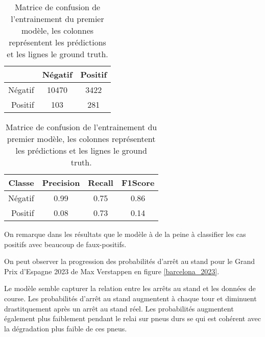 \begin{table}[H]
  \begin{center}
    \caption{\label{rf_matrix}Matrice de confusion de l'entrainement du premier modèle, les colonnes représentent les prédictions et les lignes le ground truth.}
    \begin{tabular}{r|cc}
              & Négatif & Positif \\ \hline
      Négatif & 10470   & 3422    \\
      Positif & 103     & 281     \\
    \end{tabular}
  \end{center}
\end{table}

\begin{table}[H]
  \begin{center}
    \caption{\label{rf_results}Matrice de confusion de l'entrainement du premier modèle, les colonnes représentent les prédictions et les lignes le ground truth.}
    \begin{tabular}{r|ccc}
      Classe  & Precision & Recall & F1Score \\ \hline
      Négatif & 0.99      & 0.75   & 0.86    \\
      Positif & 0.08      & 0.73   & 0.14    \\
    \end{tabular}
  \end{center}
\end{table}


On remarque dans les résultats que le modèle à de la peine à classifier les cas positifs avec beaucoup de faux-positifs.

On peut observer la progression des probabilités d'arrêt au stand pour le Grand Prix d'Espagne 2023 de Max Verstappen en figure \ref{barcelona_2023}.


Le modèle semble capturer la relation entre les arrêts au stand et les données de course.
Les probabilités d'arrêt au stand augmentent à chaque tour et diminuent drastitquement après un arrêt au stand réel.
Les probabilités augmentent également plus faiblement pendant le relai sur pneus durs se qui est cohérent avec la dégradation plus faible de ces pneus.

